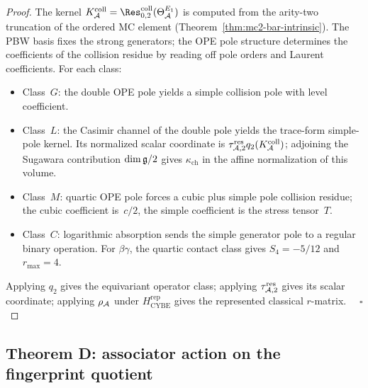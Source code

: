 \begin{proof}
The kernel $K_\cA^{\mathrm{coll}}
=\Res^{\mathrm{coll}}_{0,2}(\Theta_\cA^{E_1})$
is computed from the arity-two truncation of the ordered MC element
\textup{(}Theorem~\ref{thm:mc2-bar-intrinsic}\textup{)}. The
PBW basis fixes the strong generators; the OPE pole structure
determines the coefficients of the collision residue by reading off
pole orders and Laurent coefficients. For each class:
\begin{itemize}[leftmargin=*]
 \item Class~$G$: the double OPE pole yields a simple collision pole
 with level coefficient.
 \item Class~$L$: the Casimir channel of the double pole yields the
 trace-form simple-pole kernel. Its normalized scalar coordinate is
 $\tau_{\mathcal{A},2}^{\mathrm{res}}q_2(K_{\mathcal{A}}^{\mathrm{coll}})$; adjoining
 the Sugawara contribution $\dim\mathfrak{g}/2$ gives
 $\kappa_{\mathrm{ch}}$ in the affine normalization of this volume.
 \item Class~$M$: quartic OPE pole forces a cubic plus simple pole
 collision residue; the cubic coefficient is~$c/2$, the simple
 coefficient is the stress tensor~$T$.
 \item Class~$C$: logarithmic absorption sends the simple generator
 pole to a regular binary operation.  For $\beta\gamma$, the quartic
 contact class gives $S_4=-5/12$ and $r_{\max}=4$.
\end{itemize}
Applying $q_2$ gives the equivariant operator class; applying
$\tau_{\mathcal{A},2}^{\mathrm{res}}$ gives its scalar coordinate; applying
$\rho_{\mathcal{A}}$ under $H_{\mathrm{CYBE}}^{\mathrm{rep}}$ gives the
represented classical $r$-matrix. $\quad\square$
\end{proof}

\subsection{Theorem D: associator action on the fingerprint quotient}
\label{sec:part-iii-theorem-D}

